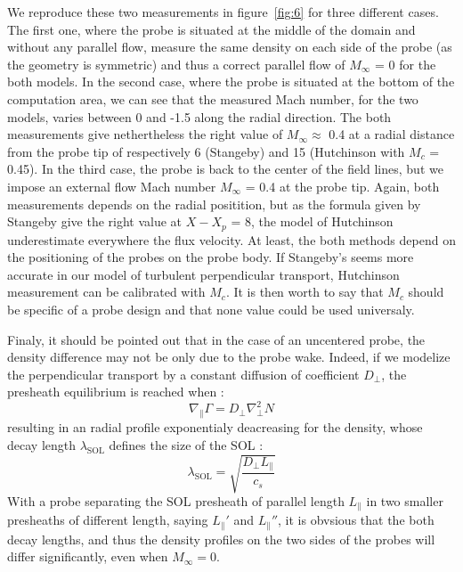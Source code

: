 \documentclass[cpp,a4paper,fleqn,twoside%
]{w-art}
\begin{document}
We reproduce these two measurements in figure~\ref{fig:6} for 
three different cases. The first one, where the probe is situated at 
the middle of the domain and without any parallel flow, measure the 
same density on each side of the probe (as the geometry is symmetric) 
and thus a correct parallel flow of $M_\infty$ = 0 for the both models.
In the second case, where the probe is situated at the bottom of the 
computation area, we can see that the measured Mach number, for the two 
models, varies between 0 and -1.5 along the radial direction. The both 
measurements give nethertheless the right value of $M_\infty\approx$ 0.4 
at a radial distance from the probe tip of respectively 6 (Stangeby) 
and 15 (Hutchinson with $M_c$ = 0.45).
In the third case, the probe is back to the center of the field lines, 
but we impose an external flow Mach number $M_\infty$ = 0.4 at the probe 
tip. Again, both measurements depends on the radial positition, but as 
the formula given by Stangeby give the right value at $X-X_p$ = 8, the 
model of Hutchinson underestimate everywhere the flux velocity.
At least, the both methods depend on the positioning of the probes on 
the probe body. If Stangeby's seems more accurate in our model of 
turbulent perpendicular transport, Hutchinson measurement can be calibrated 
with $M_c$. It is then worth to say that $M_c$ should be 
specific of a probe design and that none value could be 
used universaly.

Finaly, it should be pointed out that in the case of an uncentered probe, 
the density difference may not be only due to the probe wake. 
Indeed, if we modelize the perpendicular transport by a constant 
diffusion of coefficient $D_\perp$, the presheath equilibrium is 
reached when :
\begin{equation}
\nabla_\parallel \Gamma=D_\perp\nabla_\perp^2 N
\end{equation}
resulting in an radial profile exponentialy deacreasing for the 
density, whose decay length $\lambda_\text{SOL}$ defines the size of the SOL :
\begin{equation}
\lambda_\text{SOL}=\sqrt{\frac{D_\perp L_\parallel}{c_s}}
\end{equation}
With a probe separating the SOL presheath of parallel length 
$L_\parallel$ in two smaller presheaths of different length, saying 
$L_\parallel'$ and $L_\parallel''$, it is obvsious that the both decay 
lengths, and thus the density profiles on the two sides of the probes 
will differ significantly, even when $M_\infty=0$.
\end{document}
